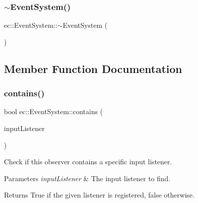 \mbox{\label{classec_1_1_event_system_ab67b98ebb182137fb1f380ee5289d1e8}} 
\subsubsection{\texorpdfstring{$\sim$\+Event\+System()}{~EventSystem()}}
{\footnotesize\ttfamily ec\+::\+Event\+System\+::$\sim$\+Event\+System (\begin{DoxyParamCaption}{ }\end{DoxyParamCaption})\hspace{0.3cm}{\ttfamily [default]}}



\subsection{Member Function Documentation}
\mbox{\label{classec_1_1_event_system_a0df83c331a79a7dfdaa9e48920d24c9f}} 
\subsubsection{\texorpdfstring{contains()}{contains()}}
{\footnotesize\ttfamily bool ec\+::\+Event\+System\+::contains (\begin{DoxyParamCaption}\item[{\mbox{\hyperlink{classec_1_1_input_listener}{Input\+Listener}} $\ast$}]{input\+Listener }\end{DoxyParamCaption})}



Check if this observer contains a specific input listener. 


\begin{DoxyParams}{Parameters}
{\em input\+Listener} & The input listener to find. \\
\hline
\end{DoxyParams}
\begin{DoxyReturn}{Returns}
True if the given listener is registered, false otherwise. 
\end{DoxyReturn}
\mbox{\label{classec_1_1_event_system_a97cde1bf5a2f1f8e5982b4d9e5e62187}} 
